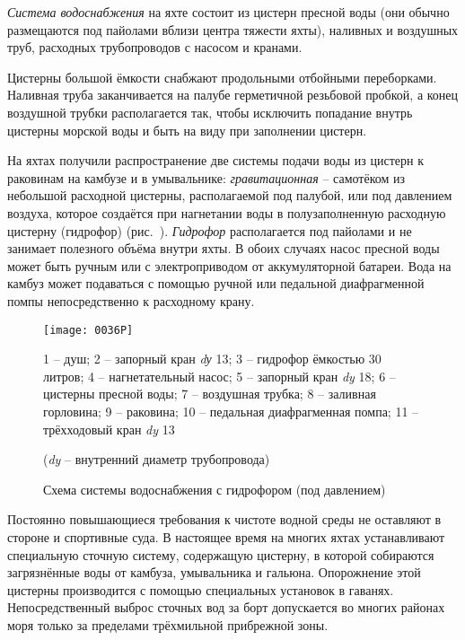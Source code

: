 \textit{Система водоснабжения} на яхте
состоит из цистерн пресной воды (они обычно размещаются под пайолами
вблизи центра тяжести яхты), наливных и воздушных труб, расходных
трубопроводов с насосом и кранами.

Цистерны большой ёмкости снабжают продольными отбойными
переборками. Наливная труба заканчивается на палубе герметичной
резьбовой пробкой, а конец воздушной трубки располагается так, чтобы
исключить попадание внутрь цистерны морской воды и быть на виду при
заполнении цистерн.

На яхтах получили распространение две системы подачи воды из цистерн к
раковинам на камбузе и в умывальнике:
\textit{гравитационная} \---
самотёком из небольшой расходной цистерны, располагаемой под палубой,
или под давлением воздуха, которое создаётся при нагнетании воды в
полузаполненную расходную цистерну (гидрофор)
(рис.~). \textit{Гидрофор}
располагается под пайолами и не занимает полезного объёма внутри
яхты. В обоих случаях насос пресной воды может быть ручным или с
электроприводом от аккумуляторной батареи. Вода на камбуз может
подаваться с помощью ручной или педальной диафрагменной помпы
непосредственно к расходному крану.

\begin{figure}[htb]
  \centering
  \texttt{[image: 0036P]}
  \caption{Схема системы водоснабжения с гидрофором (под давлением)}
  \label{fig:36}
  \small
  \centering{}
  1 \--- душ; 2 \--- запорный кран \textit{dу} 13; 3 \--- гидрофор ёмкостью 30 литров; 4 \--- нагнетательный насос; 5 \--- запорный кран \textit{dy} 18; 6 \--- цистерны пресной воды; 7 \--- воздушная трубка; 8 \--- заливная горловина; 9 \--- раковина; 10 \--- педальная диафрагменная помпа; 11 \--- трёхходовый кран \textit{dy} 13

  (\textit{dy} \--- внутренний диаметр трубопровода)
\end{figure}

Постоянно повышающиеся требования к чистоте водной среды не оставляют
в стороне и спортивные суда. В настоящее время на многих яхтах
устанавливают специальную сточную систему, содержащую цистерну, в
которой собираются загрязнённые воды от камбуза, умывальника и
гальюна. Опорожнение этой цистерны производится с помощью специальных
установок в гаванях. Непосредственный выброс сточных вод за борт
допускается во многих районах моря только за пределами трёхмильной
прибрежной зоны.

